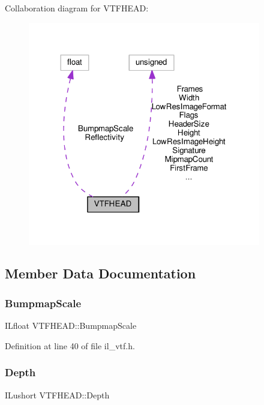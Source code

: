 Collaboration diagram for V\+T\+F\+H\+E\+AD\+:
\nopagebreak
\begin{figure}[H]
\begin{center}
\leavevmode
\includegraphics[width=288pt]{d5/d1a/structVTFHEAD__coll__graph}
\end{center}
\end{figure}


\subsection{Member Data Documentation}
\mbox{\label{structVTFHEAD_aea27568542bae7cbc6f43f70f7ec47b3}} 
\subsubsection{\texorpdfstring{Bumpmap\+Scale}{BumpmapScale}}
{\footnotesize\ttfamily I\+Lfloat V\+T\+F\+H\+E\+A\+D\+::\+Bumpmap\+Scale}



Definition at line 40 of file il\+\_\+vtf.\+h.

\mbox{\label{structVTFHEAD_aeb8b442167a6d8cdec2cd6dc68c4fb76}} 
\subsubsection{\texorpdfstring{Depth}{Depth}}
{\footnotesize\ttfamily I\+Lushort V\+T\+F\+H\+E\+A\+D\+::\+Depth}



